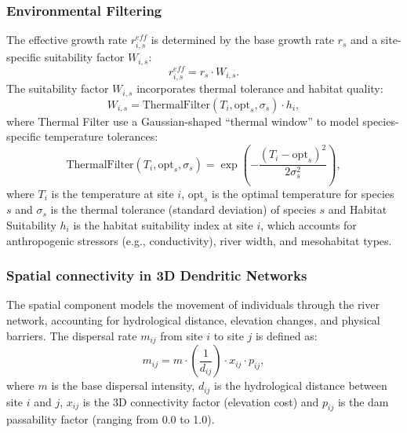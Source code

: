 \documentclass[11pt,a4paper]{article}
\begin{document}
\subsubsection{Environmental Filtering}\label{environmental-filtering}
The effective growth rate \(r_{i,s}^{eff}\) is determined by the base
growth rate \(r_{s}\) and a site-specific suitability factor
\(W_{i,s}\):
\begin{equation}
r_{i,s}^{eff} = r_{s} \cdot W_{i,s}.
\end{equation}
The suitability factor \(W_{i,s}\) incorporates thermal tolerance and
habitat quality:
\begin{equation}
W_{i,s} = \text{ThermalFilter}(T_i, \text{opt}_s, \sigma_s) \cdot h_i,
\end{equation}
where Thermal Filter\label{thermal-filter} use a Gaussian-shaped ``thermal window'' to model species-specific temperature tolerances:
\begin{equation}
\text{ThermalFilter}(T_i, \text{opt}_s, \sigma_s) = \exp\left( -\frac{(T_i - \text{opt}_s)^2}{2\sigma_s^2} \right),
\end{equation}
where \(T_i\) is the temperature at site \(i\), \(\text{opt}_s\) is
the optimal temperature for species \(s\) and \(\sigma_s\) is the thermal
tolerance (standard deviation) of species \(s\) and Habitat Suitability \label{habitat-suitability} \(h_i\) is the habitat suitability index at site \(i\), which accounts for anthropogenic stressors (e.g., conductivity), river width, and mesohabitat types.

\subsubsection{Spatial connectivity in 3D Dendritic Networks}\label{spatial-flux-3d-dendritic-dispersal}
The spatial component models the movement of individuals through the
river network, accounting for hydrological distance, elevation changes,
and physical barriers. The dispersal rate \(m_{ij}\) from site \(i\) to site \(j\) is defined as:
\begin{equation}
m_{ij} = m \cdot \left( \frac{1}{d_{ij}} \right) \cdot x_{ij} \cdot p_{ij},
\end{equation}
where \(m\) is the base dispersal intensity, \(d_{ij}\) is the
hydrological distance between site \(i\) and \(j\), \(x_{ij}\) is the
3D connectivity factor (elevation cost) and \(p_{ij}\) is the dam
passability factor (ranging from 0.0 to 1.0).
\end{document}
